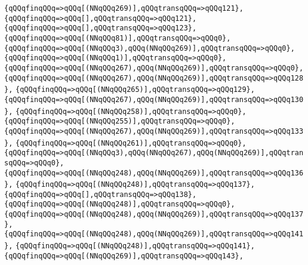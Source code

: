 \verb|{qQQqfinqQQq=>qQQq[(NNqQQq269)],qQQqtransqQQq=>qQQq121},|\newline
\verb|{qQQqfinqQQq=>qQQq[],qQQqtransqQQq=>qQQq121},|\newline
\verb|{qQQqfinqQQq=>qQQq[],qQQqtransqQQq=>qQQq123},|\newline
\verb|{qQQqfinqQQq=>qQQq[(NNqQQq81)],qQQqtransqQQq=>qQQq0},|\newline
\verb|{qQQqfinqQQq=>qQQq[(NNqQQq3),qQQq(NNqQQq269)],qQQqtransqQQq=>qQQq0},|\newline
\verb|{qQQqfinqQQq=>qQQq[(NNqQQq1)],qQQqtransqQQq=>qQQq0},|\newline
\verb|{qQQqfinqQQq=>qQQq[(NNqQQq267),qQQq(NNqQQq269)],qQQqtransqQQq=>qQQq0},|\newline
\verb|{qQQqfinqQQq=>qQQq[(NNqQQq267),qQQq(NNqQQq269)],qQQqtransqQQq=>qQQq128},|\newline
\verb|{qQQqfinqQQq=>qQQq[(NNqQQq265)],qQQqtransqQQq=>qQQq129},|\newline
\verb|{qQQqfinqQQq=>qQQq[(NNqQQq267),qQQq(NNqQQq269)],qQQqtransqQQq=>qQQq130},|\newline
\verb|{qQQqfinqQQq=>qQQq[(NNqQQq258)],qQQqtransqQQq=>qQQq0},|\newline
\verb|{qQQqfinqQQq=>qQQq[(NNqQQq255)],qQQqtransqQQq=>qQQq0},|\newline
\verb|{qQQqfinqQQq=>qQQq[(NNqQQq267),qQQq(NNqQQq269)],qQQqtransqQQq=>qQQq133},|\newline
\verb|{qQQqfinqQQq=>qQQq[(NNqQQq261)],qQQqtransqQQq=>qQQq0},|\newline
\verb|{qQQqfinqQQq=>qQQq[(NNqQQq3),qQQq(NNqQQq267),qQQq(NNqQQq269)],qQQqtransqQQq=>qQQq0},|\newline
\verb|{qQQqfinqQQq=>qQQq[(NNqQQq248),qQQq(NNqQQq269)],qQQqtransqQQq=>qQQq136},|\newline
\verb|{qQQqfinqQQq=>qQQq[(NNqQQq248)],qQQqtransqQQq=>qQQq137},|\newline
\verb|{qQQqfinqQQq=>qQQq[],qQQqtransqQQq=>qQQq138},|\newline
\verb|{qQQqfinqQQq=>qQQq[(NNqQQq248)],qQQqtransqQQq=>qQQq0},|\newline
\verb|{qQQqfinqQQq=>qQQq[(NNqQQq248),qQQq(NNqQQq269)],qQQqtransqQQq=>qQQq137},|\newline
\verb|{qQQqfinqQQq=>qQQq[(NNqQQq248),qQQq(NNqQQq269)],qQQqtransqQQq=>qQQq141},|\newline
\verb|{qQQqfinqQQq=>qQQq[(NNqQQq248)],qQQqtransqQQq=>qQQq141},|\newline
\verb|{qQQqfinqQQq=>qQQq[(NNqQQq269)],qQQqtransqQQq=>qQQq143},|\newline

